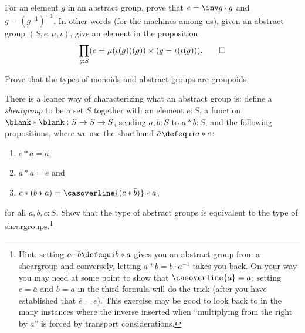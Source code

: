   \begin{xca}
    For an element $g$ in an abstract group, prove that
    $e=\inv g\cdot g$ and $g=(g^{-1})^{-1}$. In other words (for the
    machines among us), given an abstract group $(S,e,\mu,\iota)$,
    give an element in the proposition
    \begin{displaymath}
      \prod_{g:S} (e=\mu(\iota(g))(g))\times
      (g=\iota(\iota(g))).\qedhere
    \end{displaymath}
  \end{xca}
  \begin{xca}\label{xca:typemonoidisgroupoid}
    Prove that the types of monoids and abstract groups are groupoids.
  \end{xca}
  \begin{xca}
    \label{xca:cheapgroup}
    There is a leaner way of characterizing what an abstract group is:
    define a \emph{sheargroup} to be a set $S$ together with an element $e:S$,
    a function $\blank * \blank: S\to S\to S$, sending $a,b:S$ to $a*b:S$,
    and the following propositions,
    where we use the shorthand $\bar a\defequi a*e$:
    \begin{enumerate}
    \item $e*a=a$,
    \item $a*a=e$ and
    \item $c*(b*a)=\casoverline{(c*\bar b)}*a$,
    \end{enumerate}
    for all $a,b,c:S$.
    Show that the type of abstract groups is equivalent to the type of sheargroups.\footnote{%
      Hint: setting $a\cdot b\defequi \bar b*a$ gives you an abstract group from a sheargroup and conversely, letting $a*b=b\cdot a^{-1}$ takes you back.  On your way you may need at some point to show that $\casoverline{\bar a}=a$: setting $c=\bar a$ and $b=a$ in the third formula will do the trick (after you have established that $\bar e=e$).  This exercise may be good to look back to in the many instances where the inverse inserted when ``multiplying from the right by $a$'' is forced by transport considerations.}
\end{xca}
